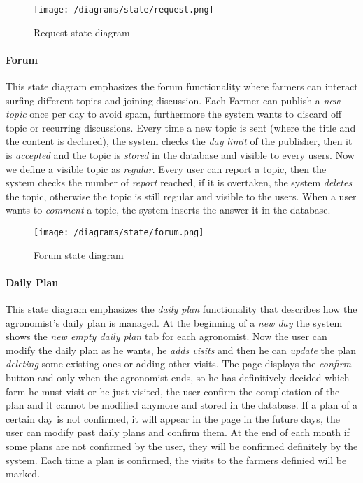 			\vspace{0.3cm}
			\begin{figure}[h]
				\centering
				\texttt{[image: /diagrams/state/request.png]}
				\caption{\label{fig:requestState}Request state diagram}
			\end{figure}
		
		\paragraph{Forum}
			This state diagram emphasizes the forum functionality where farmers can interact surfing different topics and joining discussion. Each Farmer can publish a \textit{new topic} once per day to avoid spam, furthermore the system wants to discard off topic or recurring discussions. Every time a new topic is sent (where the title and the content is declared), the system checks the \textit{day limit} of the publisher, then it is \textit{accepted} and the topic is \textit{stored} in the database and visible to every users. Now we define a visible topic as \textit{regular}. Every user can report a topic, then the system checks the number of \textit{report} reached, if it is overtaken, the system \textit{deletes} the topic, otherwise the topic is still regular and visible to the users. When a user wants to \textit{comment} a topic, the system inserts the answer it in the database. 
			
			\vspace{0.3cm}
			\begin{figure}[h]
				\centering
				\texttt{[image: /diagrams/state/forum.png]}
				\caption{\label{fig:forumState}Forum state diagram}
			\end{figure}
		
		\paragraph{Daily Plan}
		This state diagram emphasizes the \textit{daily plan} functionality that describes how the agronomist's daily plan is managed. At the beginning of a \textit{new day} the system shows the \textit{new empty daily plan} tab for each agronomist. Now the user can modify the daily plan as he wants, he \textit{adds visits} and then he can \textit{update} the plan \textit{deleting} some existing ones or adding other visits. The page displays the \textit{confirm} button and only when the agronomist ends, so he has definitively decided which farm he must visit or he just visited, the user confirm the completation of the plan and it cannot be modified anymore and stored in the database. If a plan of a certain day is not confirmed, it will appear in the page in the future days, the user can modify past daily plans and confirm them. At the end of each month if some plans are not confirmed by the user, they will be confirmed definitely by the system. Each time a plan is confirmed, the visits to the farmers definied will be marked.
		
